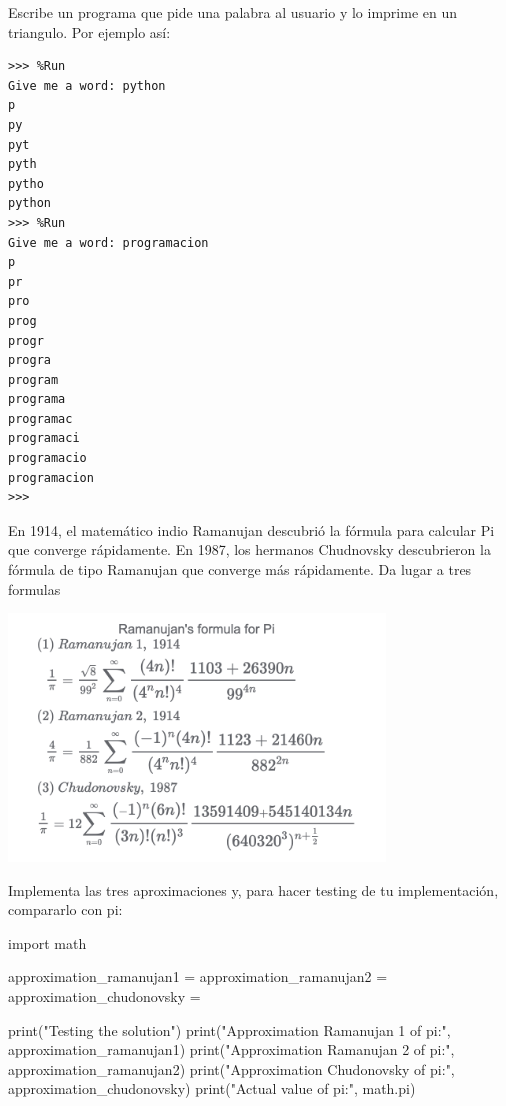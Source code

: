 \begin{ejercicio}
Escribe un programa que pide una palabra al usuario y lo imprime en un triangulo. Por ejemplo así:\\

\begin{small}
\begin{verbatim}
>>> %Run 
Give me a word: python
p
py
pyt
pyth
pytho
python
>>> %Run 
Give me a word: programacion
p
pr
pro
prog
progr
progra
program
programa
programac
programaci
programacio
programacion
>>> 
\end{verbatim}
\end{small}
\end{ejercicio}

\begin{ejercicio}
En 1914, el matemático indio Ramanujan descubrió la fórmula para calcular Pi que converge rápidamente. En 1987, los hermanos Chudnovsky descubrieron la fórmula de tipo Ramanujan que converge más rápidamente. Da lugar a tres formulas 

\includegraphics[width=10cm]{book/Spanish/04_Bucles/images/pi_aproxis.png}

Implementa las tres aproximaciones y, para hacer testing de tu implementación, compararlo con pi:

\begin{python}
import math

approximation_ramanujan1 =  
approximation_ramanujan2 =  
approximation_chudonovsky =  

print("Testing the solution")
print("Approximation Ramanujan 1 of pi:", approximation_ramanujan1)
print("Approximation Ramanujan 2 of pi:", approximation_ramanujan2)
print("Approximation Chudonovsky of pi:", approximation_chudonovsky)
print("Actual value of pi:", math.pi)    
\end{python}


\end{ejercicio}

